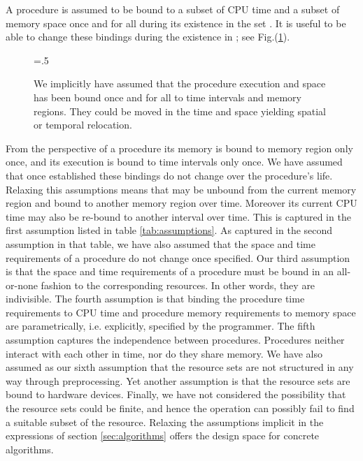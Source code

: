 \documentclass[draft]{article}
\def\figdir{.}
\begin{document}
A procedure  is assumed to be bound to a subset of CPU time
and a subset of memory space  once and for all during its existence in
the set .  It is useful  to be able to change these bindings during
the existence in  ; see Fig.(\ref{fig:moving:time:space}).
\begin{figure}[h]
  \centering
  \epsfxsize=.5\textwidth
  \epsffile{\figdir/moving-time-space-bindings.eps}
  \caption[Relocating bindings  in time and  space]{We implicitly have
    assumed that the procedure execution and space has been bound once
    and for all  to time intervals and memory  regions.  They could be
    moved  in  the  time   and  space  yielding  spatial  or  temporal
    relocation.}
  \label{fig:moving:time:space}
\end{figure}
From  the perspective  of a  procedure   its memory  is  bound to
memory region only once, and  its execution is bound to time intervals
only once.   We have assumed  that once established these  bindings do
not change over the procedure's life.  Relaxing this assumptions means
that  may be unbound from  the current memory region and bound to
another memory  region over time.   Moreover its current CPU  time may
also be re-bound  to another interval over time.   This is captured in
the  first  assumption  listed  in  table  \ref{tab:assumptions}.   As
captured in the second assumption  in that table, we have also assumed
that the space and time requirements of a procedure do not change once
specified.   Our   third  assumption  is  that  the   space  and  time
requirements of a procedure must be bound in an all-or-none fashion to
the corresponding  resources.  In  other words, they  are indivisible.
The fourth assumption is  that binding the procedure time requirements
to  CPU time  and procedure  memory requirements  to memory  space are
parametrically,  i.e. explicitly, specified  by the  programmer.  The
fifth  assumption   captures  the  independence   between  procedures.
Procedures neither interact with each other in time, nor do they share
memory.   We  have also  assumed  as  our  sixth assumption  that  the
resource  sets are not  structured in  any way  through preprocessing.
Yet another assumption is that the resource sets are bound to hardware
devices.   Finally, we have  not considered  the possibility  that the
resource sets could be finite, and hence the  operation can
possibly fail to find a suitable subset of the resource.  Relaxing the
assumptions    implicit     in    the    expressions     of    section
\ref{sec:algorithms} offers the design space for concrete algorithms.
\end{document}
